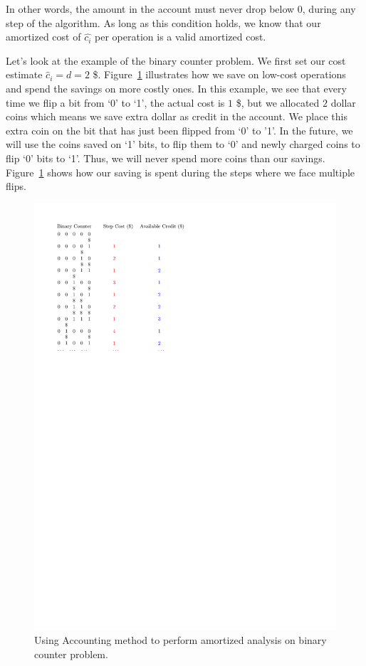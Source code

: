 \documentclass[11pt]{article}
\theoremstyle{definition}
\begin{document}
In other words, the amount in the account must never drop below 0, during any step of the algorithm.  As long as this condition holds, we know that our amortized cost of $\hat{c_i}$ per operation is a valid amortized cost. 

Let's look at the example of the binary counter problem. 
We first set our cost estimate $\hat{c}_i = d = 2$ \$. Figure~\ref{fig:accounting}
illustrates how we save on low-cost operations and spend the savings on more costly ones.  In this example, we see that every time we
flip a bit from `0' to `1', the actual cost is $1$ \$, but we allocated $2$ dollar coins which means we save extra dollar as credit in the account.  We place this extra coin on the bit that has just been flipped from `0' to '1'. In the future, we will use the coins saved on `1' bits, to flip them to `0' and newly charged coins to flip `0' bits to `1'. Thus, we will never spend more coins than our savings. Figure~\ref{fig:accounting} shows how our saving is spent during the steps where we face multiple flips. 
\begin{figure}[tbh]
\centering
\includegraphics[scale=1]{figures/accounting.pdf}
\caption{Using Accounting method to perform amortized analysis on binary counter problem.}
\label{fig:accounting}
\end{figure}
\end{document}
